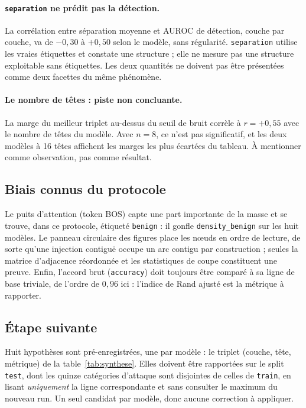\documentclass[11pt,a4paper]{article}
\begin{document}
\paragraph{\texttt{separation} ne prédit pas la détection.} La corrélation entre
séparation moyenne et AUROC de détection, couche par couche, va de $-0{,}30$ à
$+0{,}50$ selon le modèle, sans régularité. \texttt{separation} utilise les
vraies étiquettes et constate une structure ; elle ne mesure pas une structure
exploitable sans étiquettes. Les deux quantités ne doivent pas être présentées
comme deux facettes du même phénomène.

\paragraph{Le nombre de têtes : piste non concluante.} La marge du meilleur
triplet au-dessus du seuil de bruit corrèle à $r = +0{,}55$ avec le nombre de
têtes du modèle. Avec $n = 8$, ce n'est pas significatif, et les deux modèles à
16 têtes affichent les marges les plus écartées du tableau. À mentionner comme
observation, pas comme résultat.

\subsection{Biais connus du protocole}

Le puits d'attention (token BOS) capte une part importante de la masse et se
trouve, dans ce protocole, étiqueté \texttt{benign} : il gonfle
\texttt{density\_benign} sur les huit modèles. Le panneau circulaire des figures
place les n\oe uds en ordre de lecture, de sorte qu'une injection contiguë
occupe un arc contigu par construction ; seules la matrice d'adjacence
réordonnée et les statistiques de coupe constituent une preuve. Enfin, l'accord
brut (\texttt{accuracy}) doit toujours être comparé à sa ligne de base triviale,
de l'ordre de $0{,}96$ ici : l'indice de Rand ajusté est la métrique à
rapporter.

\subsection{Étape suivante}

Huit hypothèses sont pré-enregistrées, une par modèle : le triplet
(couche, tête, métrique) de la table~\ref{tab:synthese}. Elles doivent être
rapportées sur le split \texttt{test}, dont les quinze catégories d'attaque sont
disjointes de celles de \texttt{train}, en lisant \emph{uniquement} la ligne
correspondante et sans consulter le maximum du nouveau run. Un seul candidat par
modèle, donc aucune correction à appliquer.
\end{document}
